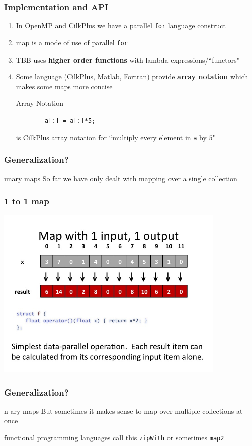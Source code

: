 \documentclass[xcolor=dvipsnames]{beamer}
\begin{document}
		\begin{frame}[fragile] \frametitle{Implementation and API}
		\begin{enumerate}
		\item In OpenMP and CilkPlus we have a parallel \texttt{for} language construct
		\item map is a mode of use of parallel \texttt{for}
		\item TBB uses \textbf{higher order functions} with lambda expressions/``functors"
		\item Some language (CilkPlus, Matlab, Fortran) provide \textbf{array notation} which makes some maps more concise\\
		\begin{exampleblock}{Array Notation}
		\begin{verbatim}
		a[:] = a[:]*5;
		\end{verbatim}
		is CilkPlus array notation for ``multiply every element in \texttt{a} by $5$" 
		\end{exampleblock}
		\end{enumerate}
		\end{frame}
		
		\begin{frame} \frametitle{Generalization?}
		\begin{block}{unary maps}
		So far we have only dealt with mapping over a single collection
		\end{block}
		\end{frame}
		
		\begin{frame} \frametitle{1 to 1 map}
		\includegraphics[width=110mm]{images/map1to1.jpg}
		\end{frame}  
		
		\begin{frame} \frametitle{Generalization?}
		\begin{block}{n-ary maps}
		But sometimes it makes sense to map over multiple collections at once 
		\end{block}
		functional programming languages call this \texttt{zipWith} or sometimes \texttt{map2}
		\end{frame}
		
\end{document}
